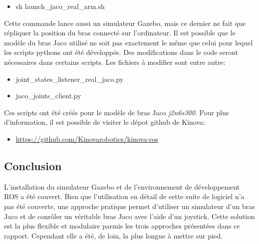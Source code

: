 \documentclass[root.tex]{subfiles}
\begin{document}
\begin{itemize}
\item sh launch\_jaco\_real\_arm.sh
\end{itemize}
Cette commande lance aussi un simulateur Gazebo, mais ce dernier ne fait que répliquer la position du bras connecté sur l'ordinateur.
Il est possible que le modèle du bras Jaco utilisé ne soit pas exactement le même que celui pour lequel les scripts pythons ont été développés. Des modifications dans le code seront nécessaires dans certains scripts. Les fichiers à modifier sont entre autre:
\begin{itemize}
\item joint\_states\_listener\_real\_jaco.py
\item jaco\_joints\_client.py
\end{itemize}
Ces scripts ont été créés pour le modèle de bras Jaco \textit{j2n6s300}. Pour plus d'information, il est possible de visiter le dépot github de Kinova:
\begin{itemize}
\item \url{https://github.com/Kinovarobotics/kinova-ros}
\end{itemize}


\subsection{Conclusion}

L'installation du simulateur Gazebo et de l'environnement de développement ROS a été couvert. 
Bien que l'utilisation en détail de cette suite de logiciel n'a pas été couverte, une approche pratique permet d'utiliser un simulateur d'un bras Jaco et de conrôler un véritable bras Jaco avec l'aide d'un joystick.
Cette solution est la plus flexible et modulaire parmis les trois approches présentées dans ce rapport.
Cependant elle a été, de loin, la plus longue à mettre sur pied.

\newpage
\end{document}
